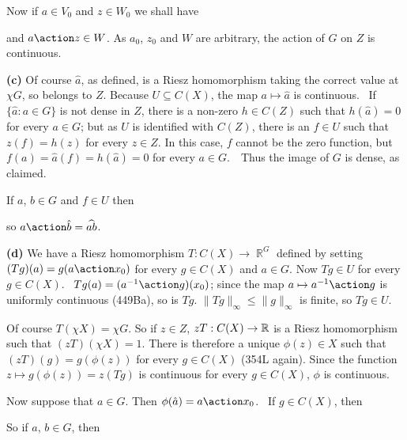 {Now if $a\in V_0$ and $z\in W_0$ we shall have


\noindent and $a\action z\in W$.
As $a_0$, $z_0$ and $W$ are arbitrary, the action of $G$ on $Z$ is
continuous.\ \Qed

\medskip

{\bf (c)} Of course $\hat a$, as defined, is a Riesz homomorphism
taking
the correct value at $\chi G$, so belongs to $Z$.   Because
$U\subseteq C(X)$, the map
$a\mapsto\hat a$ is continuous.   \Quer\ If
$\{\hat a:a\in G\}$ is not dense in $Z$, there is a non-zero $h\in
C(Z)$
such that $h(\hat a)=0$ for every $a\in G$;  but as $U$ is identified
with $C(Z)$, there is an $f\in U$ such that $z(f)=h(z)$ for every
$z\in Z$.   In this case, $f$ cannot be the zero function, but
$f(a)=\hat a(f)=h(\hat a)=0$ for every $a\in G$.\ \BanG\  Thus the
image of $G$ is dense, as claimed.

If $a$, $b\in G$ and $f\in U$ then


\noindent so $a\action\hat b=\widehat{ab}$.

\medskip

{\bf (d)} We have a Riesz homomorphism $T:C(X)\to\BbbR^G$ defined by
setting $(Tg)(a)=g(a\action x_0)$ for every $g\in C(X)$ and $a\in G$.
Now $Tg\in U$ for every $g\in C(X)$.   \Prf\
$Tg(a)=(a^{-1}\action g)(x_0)$;    since the map
$a\mapsto a^{-1}\action g$ is
uniformly continuous (449Ba), so is $Tg$.
$\|Tg\|_{\infty}\le\|g\|_{\infty}$ is finite, so $Tg\in U$.\ \Qed

Of course $T(\chi X)=\chi G$.   So if $z\in Z$, $zT:C(X)\to\Bbb R$ is
a Riesz homomorphism such that $(zT)(\chi X)=1$.   There is therefore a
unique $\phi(z)\in X$ such that $(zT)(g)=g(\phi(z))$ for every
$g\in C(X)$ (354L again).   Since the function $z\mapsto g(\phi(z))=z(Tg)$
is continuous for every $g\in C(X)$, $\phi$ is continuous.

Now suppose that $a\in G$.   Then $\phi(\hat a)=a\action x_0$.   \Prf\
If $g\in C(X)$, then


\noindent So if $a$, $b\in G$, then


}
